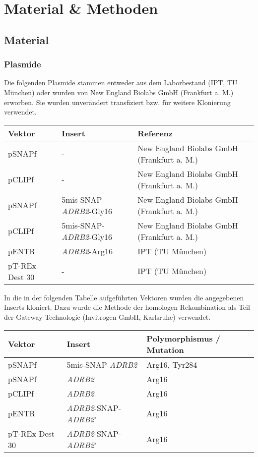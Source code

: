 \chapter{Material \& Methoden}\label{chapter:materialmethoden}

\section{Material}
\label{material}
\subsection{Plasmide} \label{plasmide}
Die folgenden Plasmide stammen entweder aus dem Laborbestand (IPT, TU München) oder wurden von New England Biolabs GmbH (Frankfurt a. M.) erworben. Sie wurden unverändert transfiziert bzw. für weitere Klonierung verwendet.

\begin{table}[htsb]
    \begin{tabularx}{\textwidth}{lll}
        \toprule
        Vektor		&	Insert						& 	Referenz	\\
        \midrule
        pSNAPf		&		-						&	New England Biolabs GmbH (Frankfurt a. M.)\\
        pCLIPf		&		-						&	New England Biolabs GmbH (Frankfurt a. M.)\\
        pSNAPf		&	5mis-SNAP-\textit{ADRB2}-Gly16	&	New England Biolabs GmbH (Frankfurt a. M.)\\
        pCLIPf		&	5mis-SNAP-\textit{ADRB2}-Gly16	&	New England Biolabs GmbH (Frankfurt a. M.)\\
        pENTR	&	\textit{ADRB2}-Arg16	   		&	IPT (TU München)\\
        pT-REx Dest 30	&	-   					&	IPT (TU München)\\
    \bottomrule
    \end{tabularx}
\end{table}

In die in der folgenden Tabelle aufgeführten Vektoren wurden die angegebenen Inserts kloniert. Dazu wurde die Methode der homologen Rekombination als Teil der Gateway-Technologie (Invitrogen GmbH, Karlsruhe) verwendet.

\begin{table}[htsb]
\begin{tabularx}{\textwidth}{lll}
\toprule
Vektor		&	Insert		&	Polymorphismus / Mutation\\
\midrule
pSNAPf		&	5mis-SNAP-\textit{ADRB2}	&	Arg16, Tyr284\\
pSNAPf		&	\textit{ADRB2}		&	Arg16\\
pCLIPf		&	\textit{ADRB2}		&	Arg16\\
pENTR		&	\textit{ADRB2}-SNAP-\textit{ADRB2}'	& Arg16\\
pT-REx Dest 30	& \textit{ADRB2}-SNAP-\textit{ADRB2}'	& Arg16\\
\bottomrule
\end{tabularx}
\end{table}

